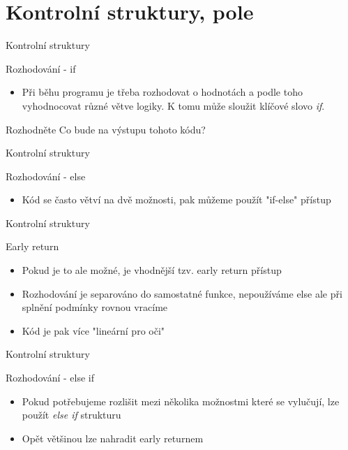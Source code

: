 \documentclass[9pt]{beamer}
\begin{document}
\section{Kontrolní struktury, pole}

\begin{frame}{Kontrolní struktury}
    \begin{block}{Rozhodování - if}
        \begin{itemize}
            \item Při běhu programu je třeba rozhodovat o hodnotách a podle toho vyhodnocovat různé větve logiky. K tomu může sloužit klíčové slovo \textit{if}.
        \end{itemize}
    \end{block}
    
    \begin{block}{Rozhodněte}
        Co bude na výstupu tohoto kódu?
    \end{block}
\end{frame}

\begin{frame}{Kontrolní struktury}
    \begin{block}{Rozhodování - else}
        \begin{itemize}
            \item Kód se často větví na dvě možnosti, pak můžeme použít "if-else" přístup
        \end{itemize}
    \end{block}
    
\end{frame}

\begin{frame}{Kontrolní struktury}
    \begin{block}{Early return}
        \begin{itemize}
            \item Pokud je to ale možné, je vhodnější tzv. early return přístup
            \item Rozhodování je separováno do samostatné funkce, nepoužíváme else
            ale při splnění podmínky rovnou vracíme
            \item Kód je pak více "lineární pro oči"
        \end{itemize}
    \end{block}
    
\end{frame}

\begin{frame}{Kontrolní struktury}
    \begin{block}{Rozhodování - else if}
        \begin{itemize}
            \item Pokud potřebujeme rozlišit mezi několika možnostmi které se vylučují, lze použít \textit{else if} strukturu
            \item Opět většinou lze nahradit early returnem
        \end{itemize}
    \end{block}
    
\end{frame}
\end{document}

